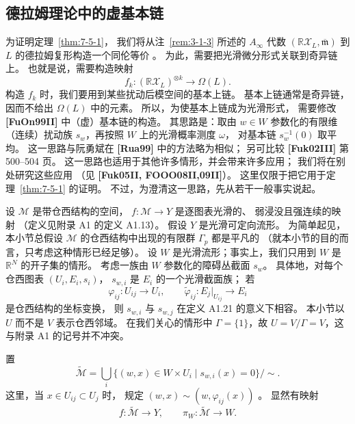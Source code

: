 
\subsection{德拉姆理论中的虚基本链}
\label{subsec:7-5-2}

为证明定理~\ref{thm:7-5-1}，
我们将从注~\ref{rem:3-1-3} 所述的
$A_\infty$ 代数
$(\mathbb R\mathcal X_L,\overline{\mathfrak m})$
到 $L$ 的德拉姆复形构造一个同伦等价
。
为此，需要把光滑微分形式关联到奇异链上。
也就是说，需要构造映射
\[
f_k\colon(\mathbb R\mathcal X_L)^{\otimes k}
\longrightarrow\Omega(L).
\]
构造 $f_k$ 时，我们要用到某些扰动后模空间的基本上链。
基本上链通常是奇异链，因而不给出 $\Omega(L)$ 中的元素。
所以，为使基本上链成为光滑形式，
需要修改 \textbf{[FuOn99II]} 中（虚）基本链的构造。
其思路是：取由 $w\in W$ 参数化的有限维（连续）扰动族
$s_w$，再按照 $W$ 上的光滑概率测度 $\omega$，
对基本链 $s_w^{-1}(0)$ 取平均。
这一思路与阮勇斌在 \textbf{[Rua99]} 中的方法略为相似；
另可比较 \textbf{[Fuk02III]} 第 500--504 页。
这一思路也适用于其他许多情形，并会带来许多应用；
我们将在别处研究这些应用
（见 \textbf{[Fuk05II, FOOO08II,09II]}）。
这里仅限于把它用于定理~\ref{thm:7-5-1} 的证明。
不过，为澄清这一思路，先从若干一般事实说起。

设 $\mathcal M$ 是带仓西结构的空间，
$f\colon\mathcal M\to Y$ 是逐图表光滑的、
弱浸没且强连续的映射
（定义见附录 A1 的定义 A1.13）。
假设 $Y$ 是光滑可定向流形。
为简单起见，本小节总假设
$\mathcal M$ 的仓西结构中出现的有限群 $\Gamma_p$ 都是平凡的
（就本小节的目的而言，只考虑这种情形已经足够）。
设 $W$ 是光滑流形；事实上，我们只用到
$W$ 是 $\mathbb R^N$ 的开子集的情形。
考虑一族由 $W$ 参数化的障碍丛截面 $s_w$。
具体地，对每个仓西图表 $(U_i,E_i,s_i)$，
$s_{w,i}$ 是 $E_i$ 的一个光滑截面族；
若
\[
\varphi_{ij}\colon U_{ij}\longrightarrow U_i,
\qquad
\widetilde\varphi_{ij}\colon
E_j|_{U_{ij}}\longrightarrow E_i
\]
是仓西结构的坐标变换，
则 $s_{w,i}$ 与 $s_{w,j}$ 在定义 A1.21 的意义下相容。
本小节以 $U$ 而不是 $V$ 表示仓西邻域。
在我们关心的情形中 $\Gamma=\{1\}$，故
$U=V/\Gamma=V$，这与附录 A1 的记号并不冲突。

置
\begin{equation}
\widetilde{\mathcal M}
=\bigcup_i
\bigl\{(w,x)\in W\times U_i\mid s_{w,i}(x)=0\bigr\}/\sim.
\tag{7.5.3}\label{eq:7-5-3}
\end{equation}
这里，当 $x\in U_{ij}\subset U_j$ 时，
规定
$(w,x)\sim(w,\varphi_{ij}(x))$
。
显然有映射
\[
f\colon\widetilde{\mathcal M}\longrightarrow Y,
\qquad
\pi_W\colon\widetilde{\mathcal M}\longrightarrow W.
\]

